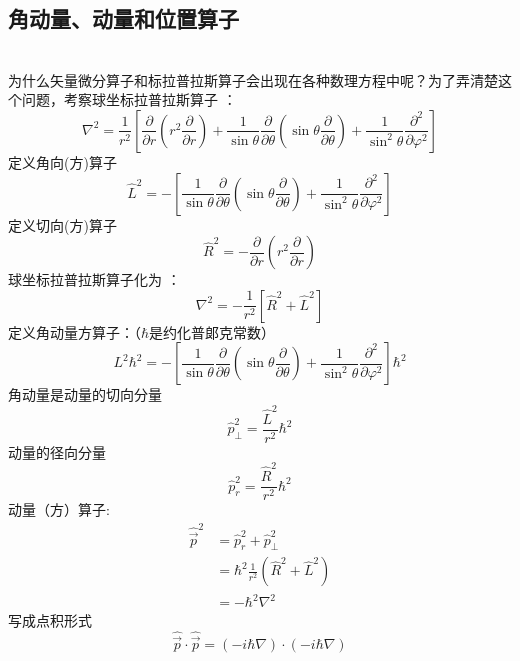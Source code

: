 \subsection{角动量、动量和位置算子} ~\\
为什么矢量微分算子和标拉普拉斯算子会出现在各种数理方程中呢？为了弄清楚这个问题，考察球坐标拉普拉斯算子 ：
	\begin{equation*}
		\nabla ^{2} =\frac{1}{r^2} \left[\frac{\partial }{\partial r} (r^2 \frac{\partial }{\partial r} )+
		\frac{1}{ \sin \theta  } \frac{\partial }{\partial \theta } (\sin \theta \frac{\partial }{\partial \theta } )
		+\frac{1}{\sin^2 \theta  } \frac{\partial^2}{\partial\varphi ^2}\right]
	\end{equation*}	
	定义角向(方)算子
	\begin{equation*}
		\hat{L}^2 = - \left[ \frac{1}{\sin \theta  } \frac{\partial }{\partial \theta } (\sin \theta \frac{\partial }{\partial \theta } )
		+\frac{1}{ \sin^2 \theta  } \frac{\partial^2}{\partial\varphi ^2} \right]
	\end{equation*}	
	定义切向(方)算子
	\begin{equation*}
		\hat{R}^2 =-\frac{\partial }{\partial r} (r^2 \frac{\partial }{\partial r} ) 
	\end{equation*}	
  球坐标拉普拉斯算子化为 ：
	\begin{equation*}
		\nabla ^{2} = - \frac{1}{r^2} \left[\hat{R}^2 + \hat{L}^2 \right]
	\end{equation*}	
	定义角动量方算子：（$\hbar$是约化普郞克常数）
  \begin{equation*}
	L^2 \hbar^2 = - \left[ \frac{1}{ \sin \theta  } \frac{\partial }{\partial \theta } (\sin \theta \frac{\partial }{\partial \theta } )
	+\frac{1}{ \sin^2 \theta  } \frac{\partial^2}{\partial\varphi ^2} \right]\hbar^2
\end{equation*}	
    角动量是动量的切向分量
	\begin{equation*}
		\hat{p}_ \perp  ^2 =  \frac{\hat{L}^2}{r^2}\hbar^2
	\end{equation*}	
	动量的径向分量
	\[ \hat{p}_r ^2 = \frac{\hat{R}^2}{r^2}  \hbar^2\]
	动量（方）算子: 
	\[
	\begin{aligned}
		\hat{\vec{p}}^2 &= \hat{p}_r ^2 + \hat{p}_ \perp  ^2 \\ 
		&= \hbar^2 \frac{1}{r^2} (\hat{R}^2+\hat{L}^2) \\
		&= - \hbar^2 \nabla ^{2}  
	\end{aligned}
	\]
	写成点积形式
	\[\hat{\vec{p}}\cdot\hat{\vec{p}} = ( -i\hbar \nabla) \cdot ( -i\hbar \nabla)\]

